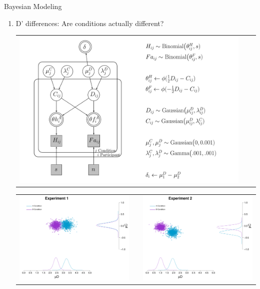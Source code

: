 \documentclass[final]{beamer}
\newlength{\onecolwid}
\newlength{\twocolwid}
\begin{document}
\begin{frame}[t]
\begin{columns}[t]
\begin{column}{\twocolwid}
\begin{columns}[t,totalwidth=\twocolwid]
\begin{column}{\onecolwid}
\begin{alertblock}{Bayesian Modeling}


\begin{enumerate}
\item D' differences: Are conditions actually different?
\begin{center}
\begin{tabular}{ccc}
\includegraphics[width=0.6\linewidth]{Figures/Delta_DiffD_Model4.pdf}
\end{tabular}
\end{center}

\begin{center}
\begin{tabular}{ccc}
\includegraphics[width=0.45\linewidth]{Figures/Modelo_Delta_MeanDC_1.pdf} & \hfill & \includegraphics[width=0.45\linewidth]{Figures/Modelo_Delta_MeanDC_2.pdf}
\end{tabular}
\end{center}


\end{enumerate}
\end{alertblock}
\end{column}
\end{columns}
\end{column}
\end{columns}
\end{frame}
\end{document}
